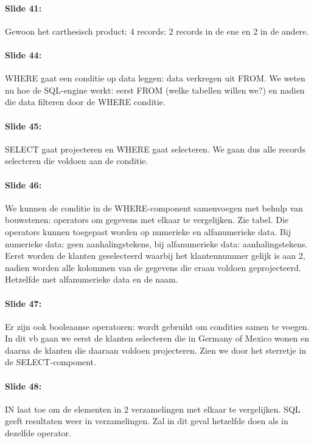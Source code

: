 \documentclass[10pt,a4paper]{report}
\begin{document}
\paragraph{Slide 41:}Gewoon het carthesisch product: 4 records: 2 records in de ene en 2 in de andere.

\paragraph{Slide 44:}WHERE gaat een conditie op data leggen: data verkregen uit FROM. We weten nu hoe de SQL-engine werkt: eerst FROM (welke tabellen willen we?) en nadien die data filteren door de WHERE conditie.

\paragraph{Slide 45:}SELECT gaat projecteren en WHERE gaat selecteren. We gaan dus alle records selecteren die voldoen aan de conditie.

\paragraph{Slide 46:}We kunnen de conditie in de WHERE-component samenvoegen met behulp van bouwstenen: operators om gegevens met elkaar te vergelijken. Zie tabel. Die operators kunnen toegepast worden op numerieke en alfanumerieke data. Bij numerieke data: geen aanhalingstekens, bij alfanumerieke data: aanhalingstekens.
Eerst worden de klanten geselecteerd waarbij het klantennummer gelijk is aan 2, nadien worden alle kolommen van de gegevens die eraan voldoen geprojecteerd. Hetzelfde met alfanumerieke data en de naam.

\paragraph{Slide 47:}Er zijn ook booleaanse operatoren: wordt gebruikt om condities samen te voegen. In dit vb gaan we eerst de klanten selecteren die in Germany of Mexico wonen en daarna de klanten die daaraan voldoen projecteren. Zien we door het sterretje in de SELECT-component.

\paragraph{Slide 48:}IN laat toe om de elementen in 2 verzamelingen met elkaar te vergelijken. SQL geeft resultaten weer in verzamelingen. Zal in dit geval hetzelfde doen als in dezelfde operator.
\end{document}
